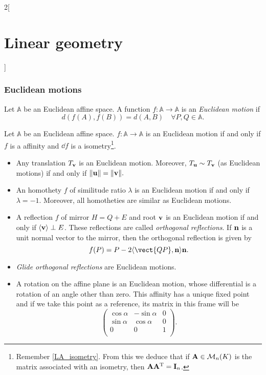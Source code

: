 \documentclass[../../../main.tex]{subfiles}
\begin{document}
\begin{multicols}{2}[\section{Linear geometry}]
  \subsubsection{Euclidean motions}
  \label{LG_euclidean_motion}
  \begin{definition}
    Let $\mathbb{A}$ be an Euclidean affine space. A function $f:\mathbb{A}\rightarrow\mathbb{A}$ is an \emph{Euclidean motion} if $$d(f(A),f(B))=d(A,B)\quad\forall P,Q\in\mathbb{A}.$$
  \end{definition}
  \begin{proposition}
    Let $\mathbb{A}$ be an Euclidean affine space. $f:\mathbb{A}\rightarrow\mathbb{A}$ is an Euclidean motion if and only if $f$ is a affinity and $\dd{f}$ is a isometry\footnote{Remember \cref{LA_isometry}. From this we deduce that if $\boldsymbol{\mathrm{A}}\in\mathcal{M}_n(K)$ is the matrix associated with an isometry, then $\boldsymbol{\mathrm{A}}\vb{A}^{\mathrm{T}}=\boldsymbol{\mathrm{I}}_n$.}.
  \end{proposition}
  \begin{proposition}
    \hfill
    \begin{itemize}
      \item Any translation $T_{\boldsymbol{\mathrm{v}}}$ is an Euclidean motion. Moreover, $T_{\boldsymbol{\mathrm{u}}}\sim T_{\boldsymbol{\mathrm{v}}}$ (as Euclidean motions) if and only if $\|\boldsymbol{\mathrm{u}}\|=\|\boldsymbol{\mathrm{v}}\|.$
      \item An homothety $f$ of similitude ratio $\lambda$ is an Euclidean motion if and only if $\lambda=-1$. Moreover, all homotheties are similar as Euclidean motions.
      \item A reflection $f$ of mirror $H=Q+E$ and root $\boldsymbol{\mathrm{v}}$ is an Euclidean motion if and only if $\langle\boldsymbol{\mathrm{v}}\rangle\perp E$. These reflections are called \emph{orthogonal reflections}. If $\boldsymbol{\mathrm{n}}$ is a unit normal vector to the mirror, then the orthogonal reflection is given by $$f(P)=P-2\langle\vect{QP},\vf{n}\rangle\vf{n}.$$
      \item \emph{Glide orthogonal reflections} are Euclidean motions.
      \item A rotation on the affine plane is an Euclidean motion, whose differential is a rotation of an angle other than zero. This affinity has a unique fixed point and if we take this point as a reference, its matrix in this frame will be $$\begin{pmatrix}
                \cos\alpha & -\sin\alpha & 0 \\
                \sin\alpha & \cos\alpha  & 0 \\
                0          & 0           & 1 \\
              \end{pmatrix}.$$
    \end{itemize}
  \end{proposition}

\end{multicols}
\end{document}
